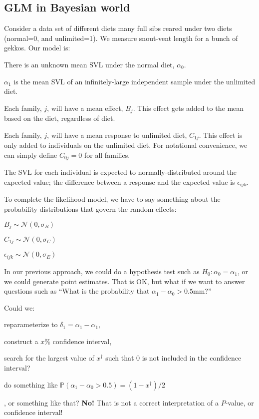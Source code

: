 \documentclass[11pt]{article}
\renewcommand{\Pr}{{\mathbb P}}
\begin{document}
\subsection*{GLM in Bayesian world}
Consider a data set of different diets many full sibs reared under two diets (normal=0, and unlimited=1).
We measure snout-vent length for a bunch of gekkos.
Our model is:
\begin{compactitem}
	\item There is an unknown mean SVL under the normal diet, $\alpha_0$.
	\item $\alpha_1$ is the mean SVL of an infinitely-large independent sample under the unlimited diet.
	\item Each family, $j$, will have a mean effect, $B_j$. This effect gets added to the mean based on the diet, regardless of diet.
	\item Each family, $j$, will have a mean response to unlimited diet, $C_{1j}$. This effect is only added to individuals on the unlimited diet. For notational convenience, we can simply define $C_{0j}=0$ for all families.
	\item The SVL for each individual is expected to normally-distributed around the expected value; the difference between a response and the expected value is $\epsilon_{ijk}$.
\end{compactitem}
To complete the likelihood model, we have to say something about the probability distributions that govern the random effects:
\begin{compactitem}
	\item $B_j \sim \mathcal{N}(0, \sigma_B)$
	\item $C_{1j} \sim \mathcal{N}(0, \sigma_C)$
	\item $\epsilon_{ijk} \sim \mathcal{N}(0, \sigma_E)$
\end{compactitem}

In our previous approach, we could do a hypothesis test such as $H_0: \alpha_0 = \alpha_1$, or we could generate point estimates.
That is OK, but what if we want to answer questions such as ``What is the probability that $\alpha_1 - \alpha_0 > 0.5$mm?''

Could we:
\begin{compactitem}
	\item reparameterize to $\delta_1 = \alpha_1 - \alpha_1$,
	\item construct a $x\%$ confidence interval,
	\item search for the largest value of $x^{\dag}$ such that 0 is not included in the confidence interval?
	\item do something like $\Pr(\alpha_1 - \alpha_0 > 0.5) = (1-x^{\dag})/2$
\end{compactitem}
, or something like that? {\bf No!} That is not a correct interpretation of a $P$-value, or confidence interval!




\newpage

\end{document}
